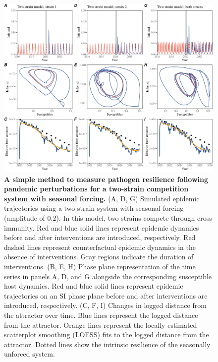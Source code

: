 \documentclass[12pt]{article}
\begin{document}
\begin{figure}[!th]
\includegraphics[width=\textwidth]{../figure2/figure2_multi.pdf}
\caption{
\textbf{A simple method to measure pathogen resilience following pandemic perturbations for a two-strain competition system with seasonal forcing.}
(A, D, G) Simulated epidemic trajectories using a two-strain system with seasonal forcing (amplitude of 0.2).
In this model, two strains compete through cross immunity.
Red and blue solid lines represent epidemic dynamics before and after interventions are introduced, respectively.
Red dashed lines represent counterfactual epidemic dynamics in the absence of interventions.
Gray regions indicate the duration of interventions.
(B, E, H) Phase plane representation of the time series in panels A, D, and G alongside the corresponding susceptible host dynamics.
Red and blue solid lines represent epidemic trajectories on an SI phase plane before and after interventions are introduced, respectively.
(C, F, I) Changes in logged distance from the attractor over time.
Blue lines represent the logged distance from the attractor.
Orange lines represent the locally estimated scatterplot smoothing (LOESS) fits to the logged distance from the attractor.
Dotted lines show the intrinsic resilience of the seasonally unforced system.
}
\end{figure}

\pagebreak
\end{document}
